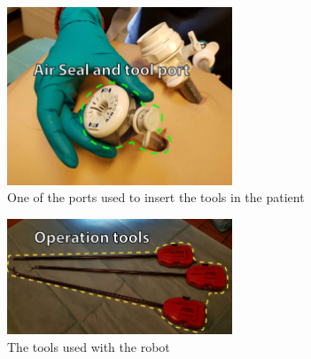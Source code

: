 \begin{figure}[H]
	\centering
	\includegraphics[width=0.6\textwidth]{FieldStudies/figures/port}
	\caption{One of the ports used to insert the tools in the patient}
	\label{fig:port}
\end{figure}

\begin{figure}[H]
	\centering
	\includegraphics[width=0.6\textwidth]{FieldStudies/figures/tools}
	\caption{The tools used with the robot}
	\label{fig:tools}
\end{figure}


